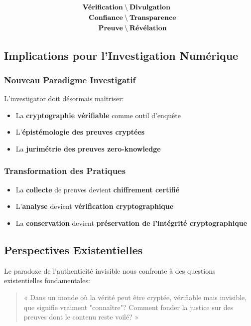 \begin{align*}
\textbf{Vérification} &\setminus \textbf{Divulgation} \\
\textbf{Confiance} &\setminus \textbf{Transparence} \\
\textbf{Preuve} &\setminus \textbf{Révélation}
\end{align*}

\subsection{Implications pour l'Investigation Numérique}
\subsubsection{Nouveau Paradigme Investigatif}
L'investigator doit désormais maîtriser:
\begin{itemize}
\item La \textbf{cryptographie vérifiable} comme outil d'enquête
\item L'\textbf{épistémologie des preuves cryptées}
\item La \textbf{jurimétrie des preuves zero-knowledge}
\end{itemize}

\subsubsection{Transformation des Pratiques}
\begin{itemize}
\item La \textbf{collecte} de preuves devient \textbf{chiffrement certifié}
\item L'\textbf{analyse} devient \textbf{vérification cryptographique}
\item La \textbf{conservation} devient \textbf{préservation de l'intégrité cryptographique}
\end{itemize}

\subsection{Perspectives Existentielles}
Le paradoxe de l'authenticité invisible nous confronte à des questions existentielles fondamentales:

\begin{quote}
« Dans un monde où la vérité peut être cryptée, vérifiable mais invisible, que signifie vraiment "connaître"? Comment fonder la justice sur des preuves dont le contenu reste voilé? »
\end{quote}

